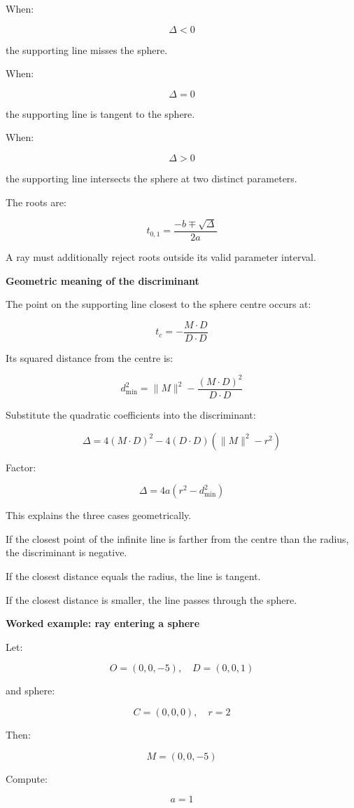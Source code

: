 When:

\[
\Delta<0
\]

the supporting line misses the sphere.

When:

\[
\Delta=0
\]

the supporting line is tangent to the sphere.

When:

\[
\Delta>0
\]

the supporting line intersects the sphere at two distinct parameters.

The roots are:

\[
\boxed{ t_{0,1}= \frac{-b\mp\sqrt{\Delta}}{2a} }
\]

A ray must additionally reject roots outside its valid parameter interval.

\textbf{Geometric meaning of the discriminant}

The point on the supporting line closest to the sphere centre occurs at:

\[
t_c=-\frac{M\cdot D}{D\cdot D}
\]

Its squared distance from the centre is:

\[
d_{\min}^2= \|M\|^2- \frac{(M\cdot D)^2}{D\cdot D}
\]

Substitute the quadratic coefficients into the discriminant:

\[
\Delta= 4(M\cdot D)^2 - 4(D\cdot D)(\|M\|^2-r^2)
\]

Factor:

\[
\boxed{ \Delta=4a(r^2-d_{\min}^2) }
\]

This explains the three cases geometrically.

If the closest point of the infinite line is farther from the centre than the radius, the discriminant is negative.

If the closest distance equals the radius, the line is tangent.

If the closest distance is smaller, the line passes through the sphere.

\textbf{Worked example: ray entering a sphere}

Let:

\[
O=(0,0,-5),\quad D=(0,0,1)
\]

and sphere:

\[
C=(0,0,0),\quad r=2
\]

Then:

\[
M=(0,0,-5)
\]

Compute:

\[
a=1
\]


